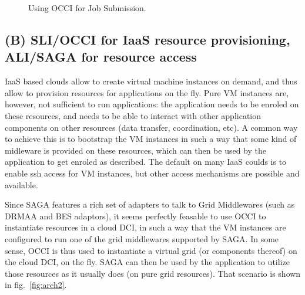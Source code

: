 \documentclass[10pt,conference,final,letterpaper,twoside,twocolumn,]{IEEEtran}
\begin{document}
\begin{figure}[htb]
 \caption{\label{fig:arch1} Using OCCI for Job Submission.}
\end{figure}

 \subsection{(B) SLI/OCCI for IaaS resource provisioning, ALI/SAGA for
 resource access} 

 IaaS based clouds allow to create virtual machine instances on
 demand, and thus allow to provision resources for applications on the
 fly.  Pure VM instances are, however, not sufficient to run
 applications: the application needs to be enroled on these resources,
 and needs to be able to interact with other application components on
 other resources (data transfer, coordination, etc).  A common way to
 achieve this is to bootstrap the VM instances in such a way that some
 kind of midleware is provided on these resources, which can then be
 used by the application to get enroled as described.  The default on
 many IaaS coulds is to enable ssh access for VM instances, but other
 access mechanisms are possible and available.

 Since SAGA features a rich set of adapters to talk to Grid
 Middlewares (such as DRMAA and BES adaptors), it seems perfectly
 feasable to use OCCI to instantiate resources in a cloud DCI, in such
 a way that the VM instances are configured to run one of the grid
 middlewares supported by SAGA.  In some sense, OCCI is thus used to
 instantiate a virtual grid (or components thereof) on the cloud DCI,
 on the fly.  SAGA can then be used by the application to utilize
 those resources as it usually does (on pure grid resources).  That
 scenario is shown in fig.~\ref{fig:arch2}.
\end{document}
